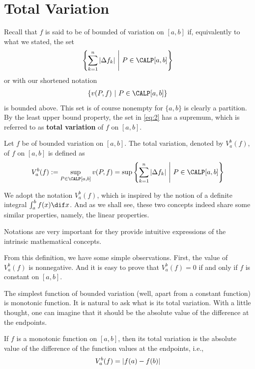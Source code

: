 \documentclass[thmcnt=section, color=blue, 12pt]{my-elegantbook}
\begin{document}
\section{Total Variation}

Recall that $f$ is said to be of bounded of variation
on $[a, b]$ if, equivalently to what we stated, the set
\begin{align}
	\set{\sum_{k=1}^n \abs{\Delta f_k}}{P \in \CALP [a, b]}
	\label{eq:2}
\end{align}
or with our shortened notation
\begin{align*}
	\set{v(P, f)}{P \in \CALP[a, b]}
\end{align*}
is bounded above.
This set is of course nonempty for $\{a, b\}$ is clearly a partition.
By the least upper bound property,
the set in \eqref{eq:2} has a supremum, which is referred to as
\textbf{total variation} of $f$ on $[a, b]$.

\begin{definition}
	Let $f$ be of bounded variation on $[a, b]$.
	The total variation, denoted by $V_a^b (f)$,
	of $f$ on $[a, b]$ is defined as
	\begin{align*}
		V_a^b (f)
		:= \sup_{P \in \CALP [a, b]} v(P, f)
		= \sup \set{\sum_{k=1}^n \abs{\Delta f_k}}{P \in \CALP [a, b]}
	\end{align*}
\end{definition}

\begin{note}
	We adopt the notation $V_a^b(f)$,
	which is inspired by the notion of
	a definite integral $\int_a^b f(x) \dif x$.
	And as we shall see,
	these two concepts indeed share some similar properties, namely,
	the linear properties.

	Notations are very important for they provide intuitive expressions
	of the intrinsic mathematical concepts.
\end{note}

From this definition,
we have some simple observations.
First, the value of $V_a^b (f)$ is nonnegative.
And it is easy to prove that $V_a^b (f) = 0$
if and only if $f$ is constant on $[a, b]$.

The simplest function of bounded variation
(well, apart from a constant function) is
monotonic function.
It is natural to ask what is its total variation.
With a little thought,
one can imagine that
it should be the absolute value of the difference at the endpoints.

\begin{proposition}
	If $f$ is a monotonic function on $[a, b]$,
	then its total variation is the absolute value of the difference
	of the function values at the endpoints, i.e.,
	\begin{align*}
		V_a^b(f) = \left\lvert f(a) - f(b) \right\rvert
	\end{align*}
\end{proposition}
\end{document}
